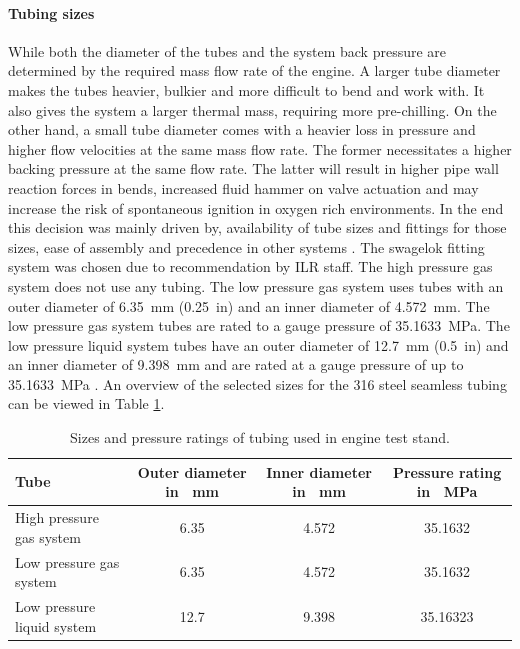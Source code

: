             \paragraph{Tubing sizes}
                While both the diameter of the tubes and the system back pressure are determined by the required mass flow rate of the engine. A larger tube diameter makes the tubes heavier, bulkier and more difficult to bend and work with. It also gives the system a larger thermal mass, requiring more pre-chilling. On the other hand, a small tube diameter comes with a heavier loss in pressure and higher flow velocities at the same mass flow rate. The former necessitates a higher backing pressure at the same flow rate. The latter will result in higher pipe wall reaction forces in bends, increased fluid hammer on valve actuation and may increase the risk of spontaneous ignition in oxygen rich environments. In the end this decision was mainly driven by, availability of tube sizes and fittings for those sizes, ease of assembly and  precedence in other systems \cite[120]{mojave_sphinx}. The swagelok fitting system was chosen due to recommendation by ILR staff. The high pressure gas system does not use any tubing. The low pressure gas system uses tubes with an outer diameter of \qty{6.35}{mm} (\qty{0.25}{in}) and an inner diameter of \qty{4.572}{mm}. The low pressure gas system tubes are rated to a gauge pressure of \qty{35.1633}{MPa}. The low pressure liquid system tubes have an outer diameter of \qty{12.7}{mm} (\qty{0.5}{in}) and an inner diameter of \qty{9.398}{mm} and are rated at a gauge pressure of up to \qty{35.1633}{MPa} \cite[2]{SL_SS_Tubing}. An overview of the selected sizes for the 316 steel seamless tubing can be viewed in Table \ref{tab:tubesizes}. 
                \begin{table}[h] 
                \centering
                    \begin{tabular}{ |p{3cm}| c | c| c|} 
                        \hline
                        Tube & Outer diameter in \qty{}{mm} & Inner diameter in \qty{}{mm} & Pressure rating in \qty{}{MPa} \\
                        \hline
                        High pressure  gas system & 6.35 & 4.572 & 35.1632\\
                        \hline
                        Low pressure gas system & 6.35 & 4.572 & 35.1632\\  
                        \hline
                        Low pressure liquid system & 12.7 & 9.398 & 35.16323\\
                        \hline
                    \end{tabular} 
                    \caption{Sizes and pressure ratings of tubing used in engine test stand.}
                    \label{tab:tubesizes}
                \end{table}
